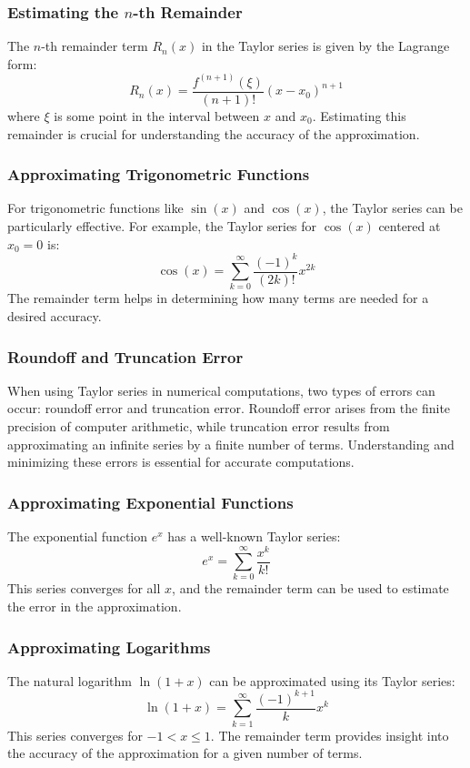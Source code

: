 \documentclass{article}
\begin{document}
\subsubsection*{Estimating the \( n \)-th Remainder}
The \( n \)-th remainder term \( R_n(x) \) in the Taylor series is given by the Lagrange form:
\[ R_n(x) = \frac{f^{(n+1)}(\xi)}{(n+1)!}(x - x_0)^{n+1} \]
where \( \xi \) is some point in the interval between \( x \) and \( x_0 \). Estimating this remainder is crucial for understanding the accuracy of the approximation.

\subsubsection*{Approximating Trigonometric Functions}
For trigonometric functions like \( \sin(x) \) and \( \cos(x) \), the Taylor series can be particularly effective. For example, the Taylor series for \( \cos(x) \) centered at \( x_0 = 0 \) is:
\[ \cos(x) = \sum_{k=0}^{\infty} \frac{(-1)^k}{(2k)!} x^{2k} \]
The remainder term helps in determining how many terms are needed for a desired accuracy.

\subsubsection*{Roundoff and Truncation Error}
When using Taylor series in numerical computations, two types of errors can occur: roundoff error and truncation error. Roundoff error arises from the finite precision of computer arithmetic, while truncation error results from approximating an infinite series by a finite number of terms. Understanding and minimizing these errors is essential for accurate computations.

\subsubsection*{Approximating Exponential Functions}
The exponential function \( e^x \) has a well-known Taylor series:
\[ e^x = \sum_{k=0}^{\infty} \frac{x^k}{k!} \]
This series converges for all \( x \), and the remainder term can be used to estimate the error in the approximation.

\subsubsection*{Approximating Logarithms}
The natural logarithm \( \ln(1+x) \) can be approximated using its Taylor series:
\[ \ln(1+x) = \sum_{k=1}^{\infty} \frac{(-1)^{k+1}}{k} x^k \]
This series converges for \( -1 < x \leq 1 \). The remainder term provides insight into the accuracy of the approximation for a given number of terms.
\end{document}
